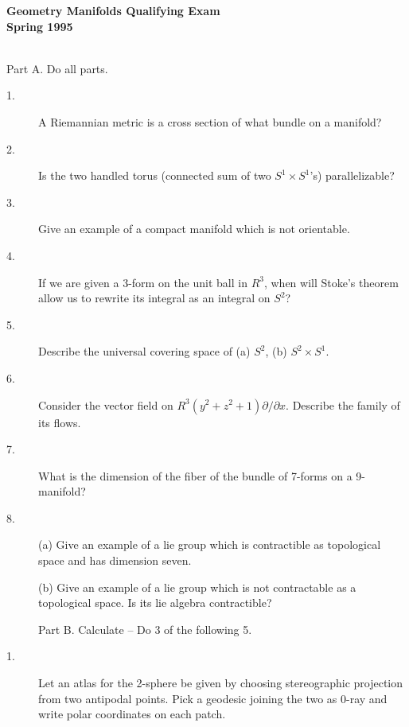 \documentclass{article}
\begin{document}






\begin{center}\begin{LARGE}
{\bf Geometry Manifolds Qualifying Exam}\\ 
{\bf Spring 1995}\\ \end{LARGE}
\end{center}
\vspace{0.1in}
\noindent\hrulefill\\

Part A. Do all parts.

\begin{description}

\item[1.]
A Riemannian metric is a cross section of what bundle on a manifold?

\item[2.]
Is the two handled torus (connected sum of two $S^1 \times S^1$'s)
parallelizable?

\item[3.]
Give an example of a compact manifold which is not orientable.

\item[4.]
If we are given a 3-form on the unit ball in $R^3$, when will Stoke's
theorem allow us to rewrite its integral as an integral on $S^2$?

\item[5.]
Describe the universal covering space of (a) $S^2$, (b) $S^2 \times S^1$.

\item[6.]
Consider the vector field on $R^3 (y^2+z^2+1) \partial / \partial x$. Describe
the family of its flows.

\item[7.]
What is the dimension of the fiber of the bundle of 7-forms on a 9-manifold?

\item[8.] (a)
Give an example of a lie group which is contractible as topological space
and has dimension seven.

\item[\quad] (b)
Give an example of a lie group which is not contractable as a
topological space.  Is its lie algebra contractible?

Part B. Calculate -- Do 3 of the following 5.
\item[1.]
Let an atlas for the 2-sphere be given by choosing stereographic
projection from two antipodal points. Pick a geodesic joining the two as
0-ray and write polar coordinates on each patch.


\end{description}
\end{document}
